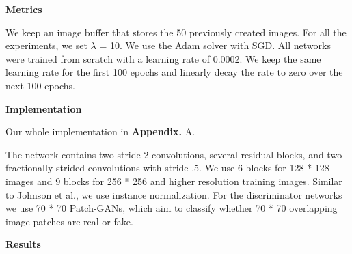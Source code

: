 \documentclass[a4paper]{article}
\begin{document}
\vspace{2mm}
\begin{center}
\large\textbf{Metrics} \\
\end{center}

\large{We keep an image buffer that stores the 50 previously created images. For all the experiments, we set $\lambda$ = 10. We use the Adam solver with SGD. All networks were trained from scratch with a learning rate of 0.0002. We keep the same learning rate for the first 100 epochs and linearly decay the rate to zero over the next 100 epochs.}

\vspace{2mm}
\begin{center}
\large\textbf{Implementation} \\
\end{center}

\large{Our whole implementation in \textbf{Appendix.} A.

The network contains two stride-2 convolutions, several residual blocks, and two fractionally strided convolutions with stride .5. We use 6 blocks for 128 * 128 images and 9 blocks for 256 * 256 and higher resolution training images. Similar to Johnson et al., we use instance normalization. For the discriminator networks we use 70 * 70 \textsf{Patch-GANs}, which aim to classify whether 70 * 70 overlapping image patches are real or fake.}

\vspace{2mm}
\begin{center}
\large\textbf{Results} \\
\end{center}
\end{document}
